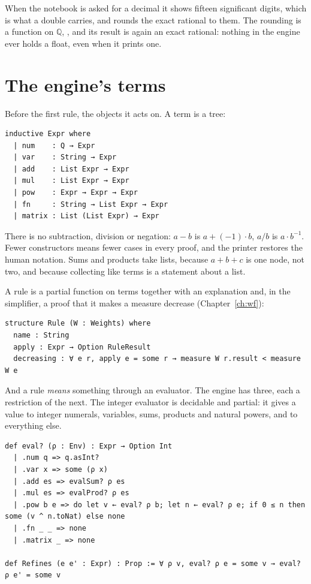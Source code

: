 When the notebook is asked for a decimal it shows fifteen significant digits, which is what a
double carries, and rounds the exact rational to them. The rounding is a function on
$\mathbb{Q}$, , and its result is again an exact rational: nothing in the engine
ever holds a float, even when it prints one.

\section{The engine's terms}

Before the first rule, the objects it acts on. A term is a tree:

\begin{verbatim}
inductive Expr where
  | num    : Q → Expr
  | var    : String → Expr
  | add    : List Expr → Expr
  | mul    : List Expr → Expr
  | pow    : Expr → Expr → Expr
  | fn     : String → List Expr → Expr
  | matrix : List (List Expr) → Expr
\end{verbatim}

There is no subtraction, division or negation: $a - b$ is $a + (-1)\cdot b$, $a/b$ is
$a \cdot b^{-1}$. Fewer constructors means fewer cases in every proof, and the printer restores the
human notation. Sums and products take lists, because $a + b + c$ is one node, not two, and
because collecting like terms is a statement about a list.

A rule is a partial function on terms together with an explanation and, in the simplifier, a
proof that it makes a measure decrease (Chapter~\ref{ch:wf}):

\begin{verbatim}
structure Rule (W : Weights) where
  name : String
  apply : Expr → Option RuleResult
  decreasing : ∀ e r, apply e = some r → measure W r.result < measure W e
\end{verbatim}

And a rule \emph{means} something through an evaluator. The engine has three, each a restriction of
the next. The integer evaluator is decidable and partial: it gives a value to integer numerals,
variables, sums, products and natural powers, and  to everything else.

\begin{verbatim}
def eval? (ρ : Env) : Expr → Option Int
  | .num q => q.asInt?
  | .var x => some (ρ x)
  | .add es => evalSum? ρ es
  | .mul es => evalProd? ρ es
  | .pow b e => do let v ← eval? ρ b; let n ← eval? ρ e; if 0 ≤ n then some (v ^ n.toNat) else none
  | .fn _ _ => none
  | .matrix _ => none

def Refines (e e' : Expr) : Prop := ∀ ρ v, eval? ρ e = some v → eval? ρ e' = some v
\end{verbatim}

